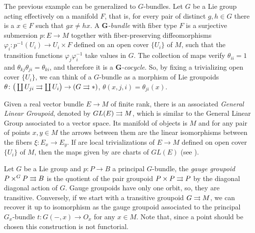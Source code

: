 \begin{example}[$G$-bundles]
The previous example can be generalized to $G$-bundles.
Let $G$ be a Lie group acting effectively on a manifold $F$, that is, for every pair of distinct $g,h\in G$ there is a $x\in F$ such that $gx\neq hx$.
A \emph{$\bm{G}$-bundle} with fiber type $F$ is a surjective submersion $p\colon E\to M$ together with fiber-preserving diffeomorphisms $\varphi_i\colon p^{-1}(U_i) \to U_i\times F$ defined on an open cover $\{U_i\}$ of $M$, such that the transition functions $\varphi_j\varphi_i^{-1}$ take values in $G$.
The collection of maps  verify $\theta_{ii}=1$ and $\theta_{kj}\theta_{ji}=\theta_{ki}$, and therefore it is a \emph{$\bm{G}$-cocycle}.
So, by fixing a trivializing open cover $\{U_i\}$, we can think of a $G$-bundle as a morphism of Lie groupoids $\theta\colon\big(\coprod U_{ji}\rightrightarrows\coprod U_i\big) \to (G\rightrightarrows *)$, $\theta(x,j,i)=\theta_{ji}(x)$.
\end{example}

\begin{example}\label{ex:gle}
Given a real vector bundle $E\to M$ of finite rank, there is an associated \emph{General Linear Groupoid}, denoted by $GL(E)\rightrightarrows M$, which is similar to the General Linear Group associated to a vector space.
Its manifold of objects is $M$ and for any pair of points $x,y\in M$ the arrows between them are the linear isomorphisms between the fibers $\xi\colon E_x\to E_y$.
If  are local trivializations of $E\to M$ defined on open cover $\{U_i\}$ of $M$, then the maps  given by  are charts of $GL(E)$ (see \cite[Example 1.1.12]{mack05}).
\end{example}

\begin{example}
Let $G$ be a Lie group and $p\colon P\to B$ a principal $G$-bundle, the \emph{gauge groupoid} $P\times^G P\rightrightarrows B$ is the quotient of the pair groupoid $P\times P\rightrightarrows P$ by the diagonal diagonal action of $G$.
Gauge groupoids have only one orbit, so, they are transitive.
Conversely, if we start with a transitive groupoid $G\rightrightarrows M$, we can recover it up to isomorphism as the gauge groupoid associated to the principal $G_x$-bundle $t\colon G(-,x)\to O_x$ for any $x\in M$.
Note that, since a point should be chosen this construction is not functorial.
\end{example}

